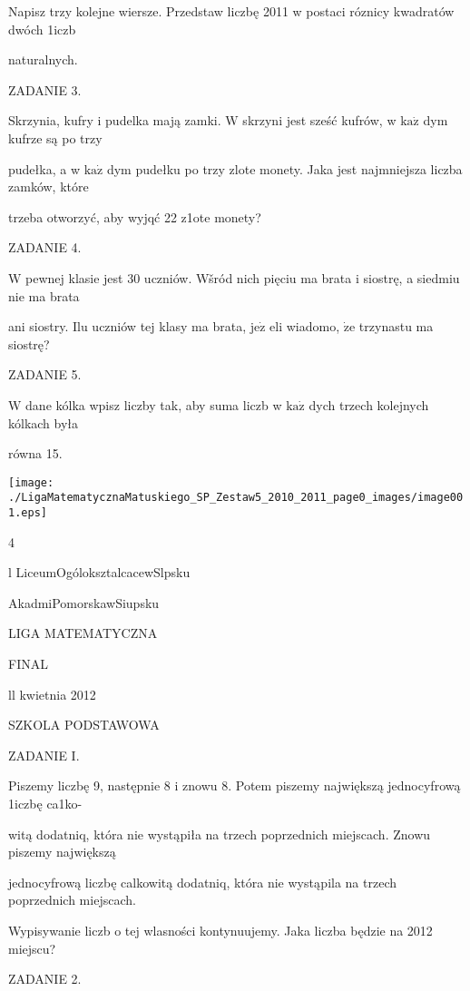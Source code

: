\documentclass[a4paper,12pt]{article}
\begin{document}
Napisz trzy kolejne wiersze. Przedstaw liczbę 2011 w postaci róznicy kwadratów dwóch 1iczb

naturalnych.

ZADANIE 3.

Skrzynia, kufry i pudelka mają zamki. $\mathrm{W}$ skrzyni jest sześć kufrów, w $\mathrm{k}\mathrm{a}\dot{\mathrm{z}}$ dym kufrze są po trzy

pudełka, a w $\mathrm{k}\mathrm{a}\dot{\mathrm{z}}$ dym pudełku po trzy zlote monety. Jaka jest najmniejsza liczba zamków, które

trzeba otworzyć, aby wyjqć 22 z1ote monety?

ZADANIE 4.

$\mathrm{W}$ pewnej klasie jest 30 uczniów. Wšród nich pięciu ma brata i siostrę, a siedmiu nie ma brata

ani siostry. Ilu uczniów tej klasy ma brata, $\mathrm{j}\mathrm{e}\dot{\mathrm{z}}$ eli wiadomo, $\dot{\mathrm{z}}\mathrm{e}$ trzynastu ma siostrę?

ZADANIE 5.

$\mathrm{W}$ dane kólka wpisz liczby tak, aby suma liczb w $\mathrm{k}\mathrm{a}\dot{\mathrm{z}}$ dych trzech kolejnych kólkach była

równa 15.
\begin{center}
\texttt{[image: ./LigaMatematycznaMatuskiego\_SP\_Zestaw5\_2010\_2011\_page0\_images/image001.eps]}
\end{center}
4






l LiceumOgóloksztalcacewSlpsku

AkadmiPomorskawSiupsku

LIGA MATEMATYCZNA

FINAL

ll kwietnia 2012

SZKOLA PODSTAWOWA

ZADANIE I.

Piszemy liczbę 9, następnie 8 i znowu 8. Potem piszemy największą jednocyfrową 1iczbę ca1ko-

witą dodatniq, która nie wystąpiła na trzech poprzednich miejscach. Znowu piszemy największą

jednocyfrową liczbę calkowitą dodatniq, która nie wystąpila na trzech poprzednich miejscach.

Wypisywanie liczb o tej wlasności kontynuujemy. Jaka liczba będzie na 2012 miejscu?

ZADANIE 2.
\end{document}
